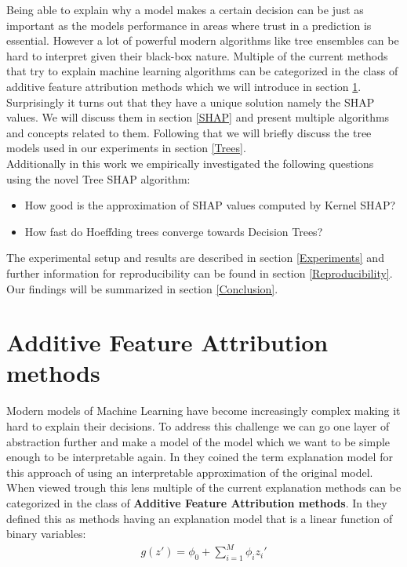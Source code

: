 \documentclass[conference]{IEEEtran}
\begin{document}
Being able to explain why a model makes a certain decision can be just as important as the models performance in areas where trust in a prediction is essential. However a lot of powerful modern algorithms like tree ensembles can be hard to interpret given their black-box nature. Multiple of the current methods that try to explain machine learning algorithms can be categorized in the class of 
additive feature attribution methods which we will introduce in section \ref{AFAM}. Surprisingly it turns out that they have a unique solution namely the SHAP values. We will discuss them in section \ref{SHAP} and present multiple algorithms and concepts related to them. Following that we will briefly discuss the tree models used in our experiments in section \ref{Trees}.\\
Additionally in this work we empirically investigated the following questions using the novel Tree SHAP algorithm:
\begin{itemize}
	\item How good is the approximation of SHAP values computed by Kernel SHAP?
	\item How fast do Hoeffding trees converge towards Decision Trees?
\end{itemize}
The experimental setup and results are described in section \ref{Experiments} and further information for reproducibility can be found in section \ref{Reproducibility}.
Our findings will be summarized in section \ref{Conclusion}.

\section{Additive Feature Attribution methods}
\label{AFAM}
Modern models of Machine Learning have become increasingly complex making it hard to explain their decisions.
To address this challenge we can go one layer of abstraction further and make a model of the model which we want to be simple enough to be interpretable again.
In \cite{b2} they coined the term explanation model for this approach of using an interpretable approximation of the original model.\\
When viewed trough this lens multiple of the current explanation methods can be categorized in the class of  \textbf{Additive Feature Attribution methods}. In \cite{b2} they defined this as methods having an explanation model that is a linear function of binary variables:\\

\begin{align}
	g(z') = \phi_0 + \sum_{i=1}^{M}\phi_i z_{i}'
\end{align}
\end{document}
